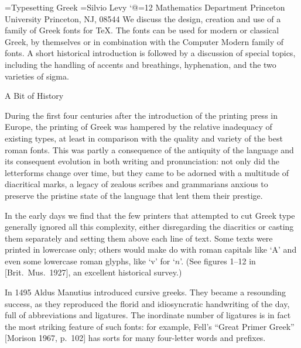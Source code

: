 \newtoks\doctitle  \newtoks\authorname

\doctitle={Typesetting Greek}
\authorname={Silvio Levy}
\catcode`@=12 %
\tenrm
\begingroup
\titlefont
\the\doctitle
\vskip 3pc
\namefont\the\authorname
\tenrm
\vskip 1pc
{\obeylines
Mathematics Department
Princeton University
Princeton, NJ, 08544
}
\vskip 3pc
\vskip 3pc
\leftskip 4pc \rightskip 4pc
We discuss the design, creation and use of a family of Greek fonts for
\TeX.  The fonts can be used for modern or classical
Greek, by themselves or in combination with the Computer Modern family
of fonts.  A short historical introduction is followed by a discussion
of special topics, including the handling of accents and breathings,
hyphenation, and the two varieties of sigma.
\par
\endgroup
\vskip 3pc

\heading A Bit of History \endheading

During the first four centuries after the introduction of the printing
press in Europe, the printing of Greek was hampered by the relative
inadequacy of existing types, at least in comparison with the quality
and variety of the best roman fonts.  This was partly a consequence
of the antiquity of the language and its consequent evolution in both
writing and pronunciation: not only did the letterforms change over time,
but they came to be adorned with a multitude of diacritical marks, a
legacy of zealous scribes and grammarians anxious to preserve the
pristine state of the language that lent them their prestige.

In the early days we find that the few printers that attempted to cut
Greek type generally ignored all this complexity, either disregarding
the diacritics or casting them separately and setting them
above each line of text.  Some texts were printed in
lowercase only; others would make do with roman capitals like `A' and
even some lowercase roman glyphs, like `v' for `$n$'.  (See figures
1--12 in [Brit.~Mus.~1927], an excellent historical survey.)

In 1495 Aldus Manutius introduced cursive greeks.
They became a resounding success, as they reproduced the florid
and idiosyncratic handwriting of the day, full of abbreviations
and ligatures.  The inordinate number of ligatures is in fact the
most striking feature of such fonts: for example, Fell's ``Great
Primer Greek'' [Morison 1967, p.~102] has sorts for many
four-letter words and prefixes.

